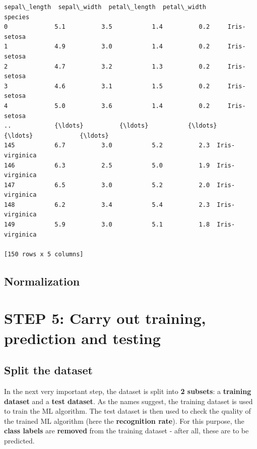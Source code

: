 \documentclass [oneside,10pt,a4paper,ngerman,BCOR10mm,headsepline,parindent,final]{scrartcl}
\makeatletter
\newcommand{\boxspacing}{\kern\kvtcb@left@rule\kern\kvtcb@boxsep}
\newcommand{\prompt}[4]{
        {\ttfamily\llap{{\color{#2}[#3]:\hspace{3pt}#4}}\vspace{-\baselineskip}}
    }
\makeatother
\begin{document}
            \begin{tcolorbox}[breakable, size=fbox, boxrule=.5pt, pad at break*=1mm, opacityfill=0]
\prompt{Out}{outcolor}{39}{\boxspacing}
\begin{Verbatim}[commandchars=\\\{\}]
     sepal\_length  sepal\_width  petal\_length  petal\_width         species
0             5.1          3.5           1.4          0.2     Iris-setosa
1             4.9          3.0           1.4          0.2     Iris-setosa
2             4.7          3.2           1.3          0.2     Iris-setosa
3             4.6          3.1           1.5          0.2     Iris-setosa
4             5.0          3.6           1.4          0.2     Iris-setosa
..            {\ldots}          {\ldots}           {\ldots}          {\ldots}             {\ldots}
145           6.7          3.0           5.2          2.3  Iris-virginica
146           6.3          2.5           5.0          1.9  Iris-virginica
147           6.5          3.0           5.2          2.0  Iris-virginica
148           6.2          3.4           5.4          2.3  Iris-virginica
149           5.9          3.0           5.1          1.8  Iris-virginica

[150 rows x 5 columns]
\end{Verbatim}
\end{tcolorbox}
        
    \hypertarget{normalization}{%
\subsection{Normalization}\label{normalization}}

    \hypertarget{step-5-carry-out-training-prediction-and-testing}{%
\section{STEP 5: Carry out training, prediction and
testing}\label{step-5-carry-out-training-prediction-and-testing}}

\hypertarget{split-the-dataset}{%
\subsection{Split the dataset}\label{split-the-dataset}}

In the next very important step, the dataset is split into \textbf{2
subsets}: a \textbf{training dataset} and a \textbf{test dataset}. As
the names suggest, the training dataset is used to train the ML
algorithm. The test dataset is then used to check the quality of the
trained ML algorithm (here the \textbf{recognition rate}). For this
purpose, the \textbf{class labels} are \textbf{removed} from the
training dataset - after all, these are to be predicted.
\end{document}

